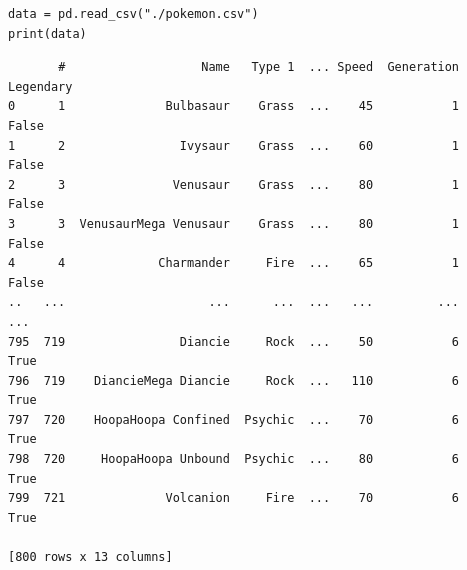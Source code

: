 \begin{frame}[fragile]
%
\begin{codebox}
\begin{verbatim}
data = pd.read_csv("./pokemon.csv")
print(data)
\end{verbatim}
\end{codebox}
%
\begin{cmdbox}
\begin{verbatim}
       #                   Name   Type 1  ... Speed  Generation  Legendary
0      1              Bulbasaur    Grass  ...    45           1      False
1      2                Ivysaur    Grass  ...    60           1      False
2      3               Venusaur    Grass  ...    80           1      False
3      3  VenusaurMega Venusaur    Grass  ...    80           1      False
4      4             Charmander     Fire  ...    65           1      False
..   ...                    ...      ...  ...   ...         ...        ...
795  719                Diancie     Rock  ...    50           6       True
796  719    DiancieMega Diancie     Rock  ...   110           6       True
797  720    HoopaHoopa Confined  Psychic  ...    70           6       True
798  720     HoopaHoopa Unbound  Psychic  ...    80           6       True
799  721              Volcanion     Fire  ...    70           6       True

[800 rows x 13 columns]
\end{verbatim}
\end{cmdbox}
%
\end{frame}



